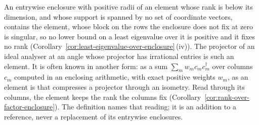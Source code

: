 
An entrywise enclosure with positive radii of an element whose rank is below
its dimension, and whose support is spanned by no set of coordinate vectors,
contains the element, whose block on the rows the enclosure does not fix at
zero is singular, so no lower bound on a least eigenvalue over it is positive
and it fixes no rank
(Corollary~\ref{cor:least-eigenvalue-over-enclosure}\,(iv)). The projector of
an ideal analyser at an angle whose projector has irrational entries is such
an element. It is often known in another form: as a sum $\sum_m w_m
c_mc_m^{\dagger}$ over columns $c_m$ computed in an enclosing arithmetic, with
exact positive weights $w_m$, as an element is that compresses a projector
through an isometry. Read through its columns, the element keeps the rank the
columns fix (Corollary~\ref{cor:rank-over-factor-enclosure}). The definition
names that reading; it is an addition to a reference, never a replacement of
its entrywise enclosures.

